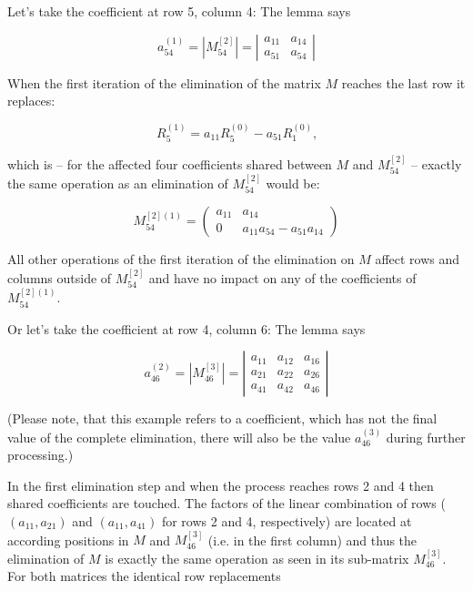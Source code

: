 \noindent
Let's take the coefficient at row 5, column 4: The lemma says

\begin{equation*}
a^{(1)}_{54} = \left| M^{[2]}_{54} \right| =
\left|
\begin{array}{cc}
a_{11} & a_{14} \\
a_{51} & a_{54}
\end{array}
\right|
\end{equation*}

\noindent
When the first iteration of the elimination of the matrix $M$ reaches the
last row it replaces:

\begin{equation*}
R^{(1)}_{5} = a_{11} R^{(0)}_{5} - a_{51} R^{(0)}_{1} \text{,}
\end{equation*}

\noindent
which is -- for the affected four coefficients shared between $M$ and
$M^{[2]}_{54}$ -- exactly the same operation as an elimination of
$M^{[2]}_{54}$ would be:

\begin{equation*}
M^{[2](1)}_{54} =
\left(
\begin{array}{cc}
a_{11} & a_{14} \\
0      & a_{11} a_{54} - a_{51} a_{14}
\end{array}
\right)
\end{equation*}

\noindent
All other operations of the first iteration of the
elimination on $M$ affect rows and columns outside of $M^{[2]}_{54}$ and have no
impact on any of the coefficients of $M^{[2](1)}_{54}$.

Or let's take the coefficient at row 4, column 6: The lemma says

\begin{equation*}
a^{(2)}_{46} = \left| M^{[3]}_{46} \right| =
\left|
\begin{array}{ccc}
a_{11} & a_{12} & a_{16} \\
a_{21} & a_{22} & a_{26} \\
a_{41} & a_{42} & a_{46}
\end{array}
\right|
\end{equation*}

\noindent
(Please note, that this example refers to a coefficient,
which has not the final value of the complete elimination, there will also
be the value $a^{(3)}_{46}$ during further processing.)

In the first elimination step and when the process reaches rows 2 and 4
then shared coefficients are touched. The factors of the linear
combination of rows ($(a_{11}, a_{21})$ and $(a_{11}, a_{41})$ for rows 2
and 4, respectively) are located at according positions in $M$ and
$M^{[3]}_{46}$ (i.e. in the first column) and thus the elimination of $M$
is exactly the same operation as seen in its sub-matrix $M^{[3]}_{46}$.
For both matrices the identical row replacements

